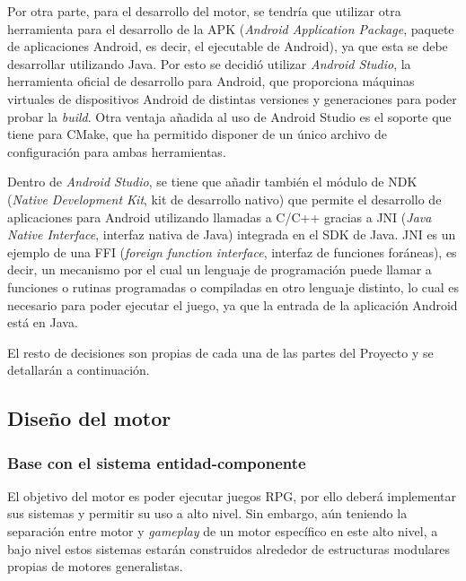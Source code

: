 \medskip

Por otra parte, para el desarrollo del motor, se tendría que utilizar otra herramienta para el desarrollo de la APK (\textit{Android Application Package}, paquete de aplicaciones Android, es decir, el ejecutable de Android), ya que esta se debe desarrollar utilizando Java. Por esto se decidió utilizar \textit{Android Studio}, la herramienta oficial de desarrollo para Android, que proporciona máquinas virtuales de dispositivos Android de distintas versiones y generaciones para poder probar la \textit{build}. Otra ventaja añadida al uso de Android Studio es el soporte que tiene para CMake, que ha permitido disponer de un único archivo de configuración para ambas herramientas.

\smallskip

Dentro de \textit{Android Studio}, se tiene que añadir también el módulo de NDK (\textit{Native Development Kit}, kit de desarrollo nativo) que permite el desarrollo de aplicaciones para Android utilizando llamadas a C/C++ gracias a JNI (\textit{Java Native Interface}, interfaz nativa de Java) integrada en el SDK de Java. JNI es un ejemplo de una FFI (\textit{foreign function interface}, interfaz de funciones foráneas), es decir, un mecanismo por el cual un lenguaje de programación puede llamar a funciones o rutinas programadas o compiladas en otro lenguaje distinto, lo cual es necesario para poder ejecutar el juego, ya que la entrada de la aplicación Android está en Java.

\medskip

El resto de decisiones son propias de cada una de las partes del Proyecto y se detallarán a continuación.

\subsection{Diseño del motor}
\subsubsection{Base con el sistema entidad-componente}
El objetivo del motor es poder ejecutar juegos RPG, por ello deberá implementar sus sistemas y permitir su uso a alto nivel. Sin embargo, aún teniendo la separación entre motor y \textit{gameplay} de un motor específico en este alto nivel, a bajo nivel estos sistemas estarán construidos alrededor de estructuras modulares propias de motores generalistas.

\medskip  

